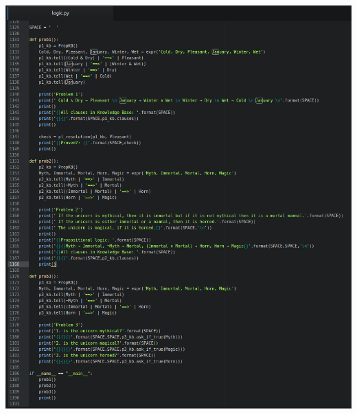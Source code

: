 \documentclass[10pt]{article}
\begin{document}
\begin{enumerate}
    \includegraphics[width=\textwidth]{hw3code1.png}
\end{enumerate}
\end{document}
